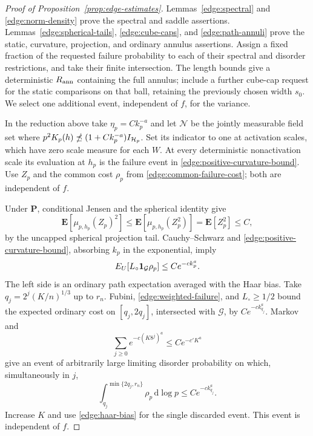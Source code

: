 \begin{proof}[Proof of Proposition~\ref{prop:edge-estimates}]
Lemmas~\ref{edge:spectral} and \ref{edge:norm-density} prove the
spectral and saddle assertions.  Lemmas~\ref{edge:spherical-tails},
\ref{edge:cube-caps}, and \ref{edge:path-annuli} prove the static,
curvature, projection, and ordinary annulus assertions.  Assign a
fixed fraction of the requested failure probability to each of their
spectral and disorder restrictions, and take their finite intersection.
The length bounds give a deterministic \(R_{\rm ann}\) containing the
full annulus; include a further cube-cap request for the static comparisons
on that ball, retaining the previously chosen width \(s_0\).
We select one additional event, independent of \(f\), for the variance.

In the reduction above take \(\eta_p=Ck_p^{-a}\) and let
\(\mathcal N\) be the jointly measurable field set where
\(p^2K_p(h)\npreceq(1+Ck_p^{-a})I_{\mathcal H_p}\).  Set its indicator to one
at activation scales, which have zero scale measure for each
\(W\).  At every deterministic nonactivation scale its evaluation at
\(h_p\) is the failure event in \eqref{edge:positive-curvature-bound}.
Use \(Z_p\) and the common cost \(\rho_p\) from
\eqref{edge:common-failure-cost}; both are independent of \(f\).

Under \(\mathbf P\), conditional Jensen and the spherical identity give
\[
 \mathbf E[\mu_{p,h_p}(Z_p)^2]
       \le\mathbf E[\mu_{p,h_p}(Z_p^2)]
       =\mathbf E[Z_p^2]\le C,
\]
by the uncapped spherical projection tail.  Cauchy--Schwarz and
\eqref{edge:positive-curvature-bound}, absorbing \(k_p\) in the
exponential, imply
\begin{equation}\label{edge:weighted-failure}
 E_U[L_\circ\mathbf 1_{\mathcal G}\rho_p]\le C e^{-c k_p^a}.
\end{equation}
The left side is an ordinary path expectation averaged with the Haar
bias.  Take \(q_j=2^j(K/n)^{1/3}\) up to \(r_n\).
Fubini, \eqref{edge:weighted-failure}, and \(L_\circ\ge1/2\) bound
the expected ordinary cost on \([q_j,2q_j]\), intersected with
\(\mathcal G\), by \(Ce^{-c k_{q_j}^a}\).  Markov and
\[
 \sum_{j\ge0}e^{-c(K8^j)^a}\le C e^{-c'K^a}
\]
give an event of arbitrarily large limiting disorder probability on
which, simultaneously in \(j\),
\begin{equation}\label{edge:quenched-error-intervals}
 \int_{q_j}^{\min\{2q_j,r_n\}}\rho_p\,\mathrm d\log p
       \le C e^{-c k_{q_j}^a}.
\end{equation}
Increase \(K\) and use \eqref{edge:haar-bias} for the single discarded
event.  This event is independent of \(f\).


\end{proof}
